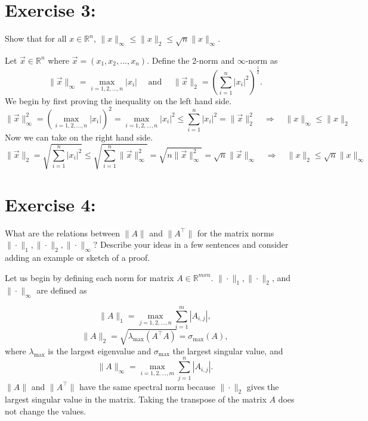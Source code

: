 \documentclass{article}
\newcommand{\R}{\mathbb{R}}
\begin{document}
\section*{Exercise 3:}

Show that for all $x\in\R^n$, $\|x\|_{\infty} \leq \|x\|_2 \leq \sqrt{n}\|x\|_{\infty}$.

\bigskip

Let $\vec{x} \in \R^n$ where $\vec{x} = \left(x_1, x_2, ... , x_n \right)$. Define the 2-norm and $\infty$-norm as
\begin{equation*}
    \| \vec{x} \|_{\infty} = \max_{i=1,2,\ldots,n} |x_i| \quad \text { and } \quad 
    \| \vec{x}\|_2 = \left( \sum_{i=1}^n |x_i|^2 \right)^{\frac{1}{2}}.
\end{equation*}
We begin by first proving the inequality on the left hand side. 
\begin{equation}
    \| \vec{x} \|_{\infty}^2 = \left(\max_{i=1,2,\ldots,n} |x_i|\right)^2 = 
    \max_{i=1,2,\ldots,n} |x_i|^2 \leq 
    \sum_{i=1}^n |x_i|^2 =
    \| \vec{x}\|_2^2 \quad \Longrightarrow \quad
    \|x\|_{\infty} \leq \|x\|_2
\end{equation}
Now we can take on the right hand side.
\begin{equation}
    \| \vec{x}\|_2 = 
    \sqrt{\sum_{i=1}^n |x_i|^2} \leq 
    \sqrt{\sum_{i=1}^n \| \vec{x} \|_{\infty}^2} =
    \sqrt{n\| \vec{x} \|_{\infty}^2} =
    \sqrt{n}\| \vec{x} \|_{\infty} \quad \Longrightarrow \quad
    \|x\|_2 \leq \sqrt{n}\|x\|_{\infty}
\end{equation}

\section*{Exercise 4:}

What are the relations between $\|A \|$ and $\|A^\top\|$ for the matrix norms $\|\cdot\|_1, \|\cdot\|_2, \|\cdot\|_{\infty}$? Describe your ideas in a few sentences and consider adding an example or sketch of a proof.

\bigskip
Let us begin by defining each norm for matrix $A \in \R^{mxn}$. $\|\cdot\|_1, \|\cdot\|_2$, and  $\|\cdot\|_{\infty}$ are defined as

\begin{equation*}
    \| A \|_1 = \max_{j=1,2,\ldots,n} \sum_{i=1}^m |A_{i,j}|,
\end{equation*}
\begin{equation*}
    \|A \|_2 = \sqrt{\lambda_{\max} (A^\top A)} = \sigma_{\max}(A),
\end{equation*}
where $\lambda_{\max}$ is the largest eigenvalue and $\sigma_{\max}$ the largest singular value, and
\begin{equation*}
    \| A \|_{\infty} = \max_{i=1,2,\ldots,m} \sum_{j=1}^n |A_{i,j}|.
\end{equation*}
$\|A \|$ and $\|A^\top\|$ have the same spectral norm because $\|\cdot\|_2$ gives the largest singular value in the matrix. Taking the transpose of the matrix $A$ does not change the values. 
\end{document}
